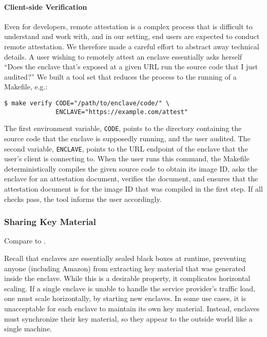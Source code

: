 \paragraph{Client-side Verification}

Even for developers, remote attestation is a complex process that is difficult
to understand and work with, and in our setting, end users are expected to
conduct remote attestation.  We therefore made a careful effort to abstract
away technical details.  A user wishing to remotely attest an enclave
essentially asks herself ``Does the enclave that's exposed at a given URL run
the source code that I just audited?''  We built a tool set that reduces the
process to the running of a Makefile, e.g.:

\begin{lstlisting}
$ make verify CODE="/path/to/enclave/code/" \
              ENCLAVE="https://example.com/attest"
\end{lstlisting}

The first environment variable, \texttt{CODE}, points to the directory
containing the source code that the enclave is supposedly running, and the user
audited.  The second variable, \texttt{ENCLAVE}, points to the URL endpoint of
the enclave that the user's client is connecting to.  When the user runs this
command, the Makefile deterministically compiles the given source code to
obtain its image ID, asks the enclave for an attestation document, verifies the
document, and ensures that the attestation document is for the image ID that
was compiled in the first step.  If all checks pass, the tool informs the user
accordingly.

\subsubsection{Sharing Key Material}
\label{sec:sync}

Compare to \cite{Chen2022a}.

Recall that enclaves are essentially sealed black boxes at runtime, preventing
anyone (including Amazon) from extracting key material that was generated
inside the enclave.  While this is a desirable property, it complicates
horizontal scaling.  If a single enclave is unable to handle the service
provider's traffic load, one must scale horizontally, by starting new enclaves.
In some use cases, it is unacceptable for each enclave to maintain its own key
material.  Instead, enclaves must synchronize their key material, so they
appear to the outside world like a single machine.

